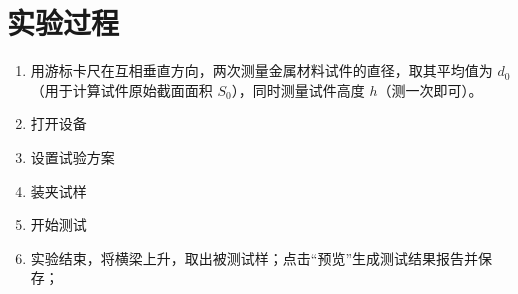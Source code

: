 \documentclass[a4paper,utf8]{article}
\begin{document}
\section{实验过程}%
    \begin{enumerate}
        \item 用游标卡尺在互相垂直方向，两次测量金属材料试件的直径，取其平均值为 $d_0$（用于计算试件原始截面面积 $S_0$），同时测量试件高度 $h$（测一次即可）。
        \item 打开设备
        \item 设置试验方案
        \item 装夹试样
        \item 开始测试
        \item 实验结束，将横梁上升，取出被测试样；点击“预览”生成测试结果报告并保存；
    \end{enumerate}
\end{document}
